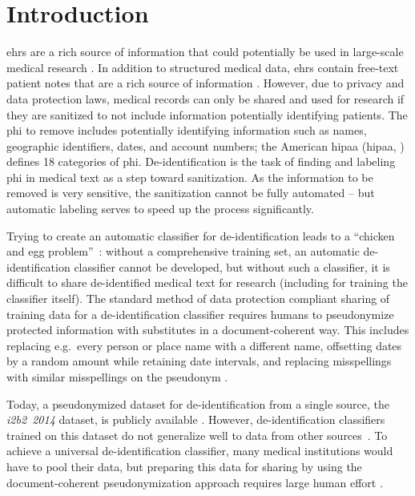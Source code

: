 

\section{Introduction}\label{sec:introduction}
%
\Acp{ehr} are a rich source of information that could potentially be used in large-scale medical research \citep{botsis2010secondary, birkhead2015uses, cowie2017electronic}.
%
In addition to structured medical data, \acp{ehr} contain free-text patient notes that are a rich source of information \citep{jensen2012mining}.
%
However, due to privacy and data protection laws, medical records can only be shared and used for research if they are sanitized to not include information potentially identifying patients.
%
The \ac{phi} to remove includes potentially identifying information such as names, geographic identifiers, dates, and account numbers; the American \acl{hipaa} (\acs{hipaa}, \citeyear{usa1996hipaa}) defines 18 categories of \ac{phi}.
%
De-identification is the task of finding and labeling \ac{phi} in medical text as a step toward sanitization.
%
As the information to be removed is very sensitive, the sanitization cannot be fully automated -- but automatic labeling serves to speed up the process significantly.

%
Trying to create an automatic classifier for de-identification leads to a ``chicken and egg problem''~\citep{uzuner2007evaluating}: without a comprehensive training set, an automatic de-identification classifier cannot be developed, but without such a classifier, it is difficult to share de-identified medical text for research (including for training the classifier itself).
%
The standard method of data protection compliant sharing of training data for a de-identification classifier requires humans to pseudonymize protected information with substitutes in a document-coherent way.
%
This includes replacing e.g.\ every person or place name with a different name, offsetting dates by a random amount while retaining date intervals, and replacing misspellings with similar misspellings on the pseudonym \cite{uzuner2007evaluating}.

%
Today, a pseudonymized dataset for de-identification from a single source, the \emph{i2b2~2014} dataset, is publicly available \citep{stubbs2015annotating}.
%
However, de-identification classifiers trained on this dataset do not generalize well to data from other sources~\citep{stubbs2017identification}.
%
To achieve a universal de-identification classifier, many medical institutions would have to pool their data, but
%
preparing this data for sharing by using the document-coherent pseudonymization approach requires large human effort \citep{dernoncourt2017identification}.

